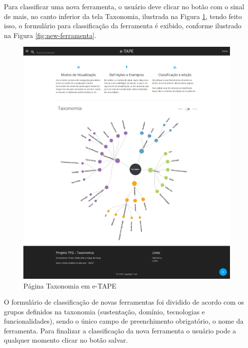 \par
Para classificar uma nova ferramenta, o usuário deve clicar no botão com o  sinal de mais, no canto inferior da tela Taxonomia, ilustrada na Figura \ref{fig:pag-taxonomia},
tendo feito isso, o formulário para classificação da ferramenta é exibido, conforme ilustrado na Figura \ref{fig:new-ferramenta}. 

\begin{figure}[!ht]
    \centering
    \includegraphics[scale=0.10]{./figuras/pagina-taxonomia.png}
    \caption{Página Taxonomia em e-TAPE }
    \label{fig:pag-taxonomia}
\end{figure}

\par
O formulário de classificação de novas ferramentas foi dividido de acordo com os grupos definidos na taxonomia 
(sustentação, domínio, tecnologias e funcionalidades), sendo o único campo de preenchimento obrigatório, o nome da ferramenta.
Para finalizar a classificação da nova ferramenta o usuário pode a qualquer momento clicar no botão salvar. 


